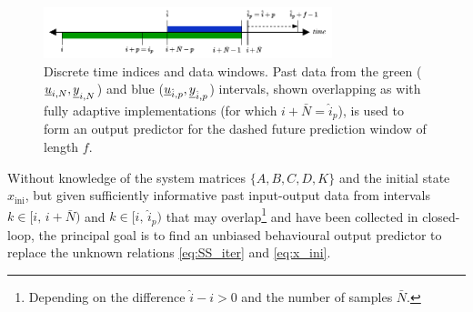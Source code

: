 \begin{figure}[b!]
	\centering
	\includegraphics[width=8.4cm]{docs/manuscript/figures/intervals_DeePC.pdf}%
	\caption{Discrete time indices and data windows. Past data from the green ($\underline{u}_{i,\relax{N}},\underline{y}_{i,\relax{N}}$) and blue ($\underline{u}_{\hat{i},p},\underline{y}_{\hat{i},p}$) intervals, shown overlapping as with fully adaptive implementations (for which $i+\bar{N}=\hat{i}_p$), is used to form an output predictor for the dashed future prediction window of length $f$.}
	\label{fig:intervals_DeePC}
\end{figure}

Without knowledge of the system matrices $\{A,B,C,D,K\}$ and the initial state $x_\mathrm{ini}$, but given sufficiently informative past input-output data from  intervals $k\in[i,\,i+\bar{N})$ and $k\in[\hat{i},\,\hat{i}_p)$ that may overlap\footnote{Depending on the difference $\hat{i}-i>0$ and the number of samples $\bar{N}$.} and have been collected in closed-loop, the principal goal is to find an unbiased behavioural output predictor to replace the unknown relations \eqref{eq:SS_iter} and \eqref{eq:x_ini}.

